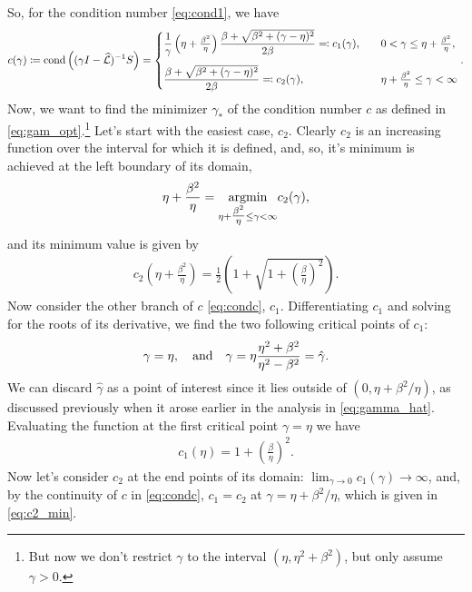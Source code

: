 \documentclass[a4paper,10pt]{article}
\begin{document}
So, for the condition number \eqref{eq:cond1}, we have
\begin{align}
\label{eq:condc}
c(\gamma) 
\coloneqq
\textnormal{cond}\left((\gamma I- \widehat{\mathcal{L}})^{-1}S\right)  
=
\begin{cases}
\displaystyle
\frac{1}{\gamma} \left(\eta + \tfrac{\beta^2}{\eta} \right) \frac{\beta + \sqrt{\beta^2 + (\gamma-\eta)^2}}{2\beta}
\eqqcolon c_1(\gamma), 
\quad & 0 < \gamma \leq \eta + \tfrac{\beta^2}{\eta},
\\[3ex]
\displaystyle
\frac{\beta + \sqrt{\beta^2 + (\gamma-\eta)^2}}{2\beta}
\eqqcolon c_2(\gamma), 
\quad &\eta + \tfrac{\beta^2}{\eta} \leq \gamma < \infty 
\end{cases}.
\end{align}
Now, we want to find the minimizer $\gamma_*$ of the condition number $c$ as defined in \eqref{eq:gam_opt}.\footnote{But now we don't restrict $\gamma$ to the interval $(\eta, \eta^2 + \beta^2)$, but only assume $\gamma > 0$.} Let's start with the easiest case, $c_2$. Clearly $c_2$ is an increasing function over the interval for which it is defined, and, so, it's minimum is achieved at the left boundary of its domain,
\begin{align*}
\eta + \frac{\beta^2}{\eta} = \underset{\eta + \tfrac{\beta^2}{\eta} \leq  \gamma < \infty}{\textnormal{argmin}} c_2(\gamma),
\end{align*}
and its minimum value is given by
\begin{align} 
\label{eq:c2_min}
c_2\left(\eta + \frac{\beta^2}{\eta} \right) = \frac{1}{2} \left( 1 + \sqrt{1 + \left( \frac{\beta}{\eta} \right)^2} \right).
\end{align}
Now consider the other branch of $c$ \eqref{eq:condc}, $c_1$. 
%
Differentiating $c_1$ and solving for the roots of its derivative, we find the two following critical points of $c_1$:
\begin{align*}
\gamma = \eta, \quad {\rm and} \quad \gamma = \eta \frac{\eta^2 + \beta^2}{\eta^2 - \beta^2} = \hat{\gamma}.
\end{align*}
We can discard $\hat{\gamma}$ as a point of interest since it lies outside of $(0, \eta + \beta^2/\eta)$, as discussed previously when it arose earlier in the analysis in \eqref{eq:gamma_hat}.
Evaluating the function at the first critical point $\gamma = \eta$ we have
\begin{align}
\label{eq:c1_non-opt}
c_1(\eta) = 1 + \left( \frac{\beta}{\eta} \right)^2.
\end{align}
Now let's consider $c_2$ at the end points of its domain: $\lim_{\gamma \to 0} c_1(\gamma) \to \infty$, and, by the continuity of $c$ in  \eqref{eq:condc}, $c_1 = c_2$  at $\gamma = \eta + \beta^2/\eta$, which is given in \eqref{eq:c2_min}. 
\end{document}
